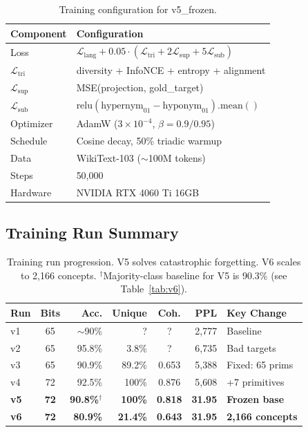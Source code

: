 \documentclass[11pt, a4paper]{article}
\begin{document}
\begin{table}[ht]
\centering
\small
\begin{tabular}{ll}
\toprule
\textbf{Component} & \textbf{Configuration} \\
\midrule
Loss       & $\mathcal{L}_\text{lang} + 0.05 \cdot (\mathcal{L}_\text{tri} + 2\mathcal{L}_\text{sup} + 5\mathcal{L}_\text{sub})$ \\
$\mathcal{L}_\text{tri}$  & diversity + InfoNCE + entropy + alignment \\
$\mathcal{L}_\text{sup}$  & MSE(projection, gold\_target) \\
$\mathcal{L}_\text{sub}$  & $\text{relu}(\text{hypernym}_{01} - \text{hyponym}_{01}).\text{mean}()$ \\
Optimizer  & AdamW ($3 \times 10^{-4}$, $\beta = 0.9/0.95$) \\
Schedule   & Cosine decay, 50\% triadic warmup \\
Data       & WikiText-103 ($\sim$100M tokens) \\
Steps      & 50,000 \\
Hardware   & NVIDIA RTX 4060 Ti 16GB \\
\bottomrule
\end{tabular}
\caption{Training configuration for v5\_frozen.}
\label{tab:training}
\end{table}

\subsection{Training Run Summary}

\begin{table}[ht]
\centering
\small
\begin{tabular}{lcrrcrl}
\toprule
\textbf{Run} & \textbf{Bits} & \textbf{Acc.} & \textbf{Unique} & \textbf{Coh.} & \textbf{PPL} & \textbf{Key Change} \\
\midrule
v1 & 65 & $\sim$90\% & ? & ? & 2,777 & Baseline \\
v2 & 65 & 95.8\% & 3.8\% & ? & 6,735 & Bad targets \\
v3 & 65 & 90.9\% & 89.2\% & 0.653 & 5,388 & Fixed: 65 prims \\
v4 & 72 & 92.5\% & 100\% & 0.876 & 5,608 & +7 primitives \\
\textbf{v5} & \textbf{72} & \textbf{90.8\%}$^\dagger$ & \textbf{100\%} & \textbf{0.818} & \textbf{31.95} & \textbf{Frozen base} \\
\textbf{v6} & \textbf{72} & \textbf{80.9\%} & \textbf{21.4\%} & \textbf{0.643} & \textbf{31.95} & \textbf{2{,}166 concepts} \\
\bottomrule
\end{tabular}
\caption{Training run progression. V5 solves catastrophic forgetting. V6 scales to 2{,}166 concepts. $^\dagger$Majority-class baseline for V5 is 90.3\% (see Table~\ref{tab:v6}).}
\label{tab:runs}
\end{table}
\end{document}
